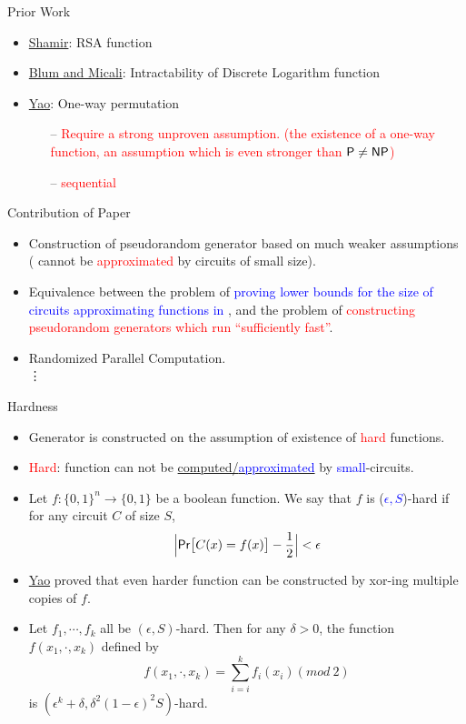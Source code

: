 \documentclass[xcolor={table,dvipsnames,usenames}]{beamer}
\begin{document}
\begin{frame}{Prior Work}
\begin{itemize}
	\item \href{https://link.springer.com/chapter/10.1007/3-540-10843-2_43}{Shamir}: RSA function
	\item  \href{https://dl.acm.org/citation.cfm?id=2068}{Blum and Micali}: Intractability of Discrete Logarithm function
	\item \href{https://ieeexplore.ieee.org/document/4568378}{Yao}: One-way permutation
	\pause
	\begin{itemize}
		\item[--] \textcolor{red}{Require a strong unproven assumption. (the existence of a one-way function, an assumption which is even stronger than $ \mathsf{P} \neq \mathsf{NP}$)}
		\item[--] \textcolor{red}{sequential}
	\end{itemize}
\end{itemize}
\end{frame}
\begin{frame}{Contribution of Paper}
\begin{itemize}
	\pause
	\item Construction of pseudorandom generator based on much weaker assumptions ({\EXPTIME} cannot be \textcolor{red}{approximated} by circuits of small size).
	\pause
	\item Equivalence between the problem of \textcolor{blue}{proving lower bounds for the size of circuits approximating functions in {\EXPTIME}}, and the problem of \textcolor{red}{constructing pseudorandom generators which run ``sufficiently fast''}.
	\pause
	\item Randomized Parallel Computation.\\
	\pause
	\quad \quad \vdots
\end{itemize}
\end{frame}
\begin{frame}{Hardness}
\begin{itemize}
	\item Generator is constructed on the assumption of existence of \textcolor{red}{hard} functions.
	\pause
	\item \textcolor{red}{Hard}: function can not be \underline{computed/\textcolor{blue}{approximated}} by \textcolor{blue}{small}-circuits.
	\pause
	\item  Let $f:\{0,1\}^n \rightarrow \{0, 1\}$ be a boolean function. We say that $f$ is (\textcolor{blue}{$\epsilon,S$})-hard if for any circuit $C$ of size $S$,
	$$\Big|\mathsf{Pr}\big[C(x)=f(x)\big]- \frac{1}{2}\Big| < \epsilon$$
	\pause
	\item \href{https://ieeexplore.ieee.org/document/4568378/}{Yao} proved that even harder function can be constructed by xor-ing multiple copies of $f$.
	\pause
	\item Let $f_1, \cdots, f_k$ all be $(\epsilon,S)$-hard. Then for any $\delta>0$, the function $f(x_1, \cdot, x_k)$ defined by
	$$f(x_1, \cdot, x_k)= \sum_{i = i}^{k} f_i(x_i) (mod~2)$$
	is  $(\epsilon^k + \delta, \delta^2(1-\epsilon)^2S)$-hard.
\end{itemize}
\end{frame}
\end{document}
